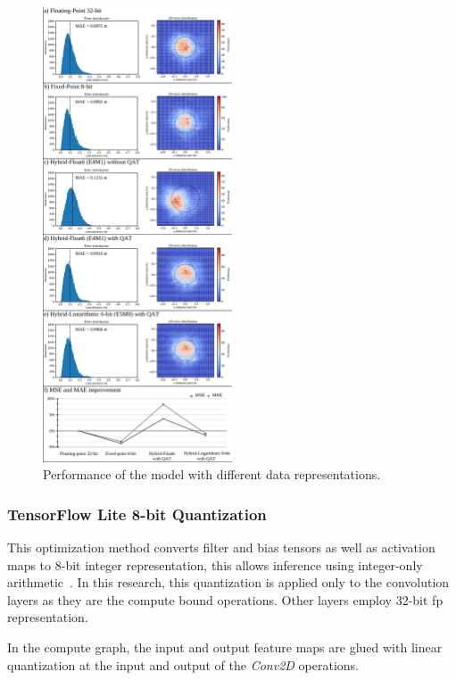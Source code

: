 \begin{figure}[h!]
	\centering
	\includegraphics[width=0.5\textwidth]{./chapters/cnn_accelerator/figures/histograms/model_evaluation.pdf}
	\caption{Performance of the model with different data representations.}
	\label{fig:model_evaluation}
\end{figure}

\subsubsection{TensorFlow Lite 8-bit Quantization}
This optimization method converts filter and bias tensors as well as activation maps to 8-bit integer representation, this allows inference using integer-only arithmetic~\cite{hannwindowsine}. In this research, this quantization is applied only to the convolution layers as they are the compute bound operations. Other layers employ 32-bit \gls{fp} representation.

In the compute graph, the input and output feature maps are glued with linear quantization at the input and output of the \emph{Conv2D} operations.

